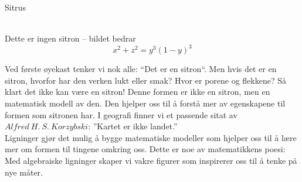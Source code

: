 \documentclass[no]{./../../common/SurferDesc}%
\begin{document}
\footnotesize

\begin{surferPage}
  \begin{surferTitle}Sitrus\end{surferTitle}  \\ %
Dette er ingen sitron – bildet bedrar\\
\smallskip
\[x^2 + z^2 = y^3 (1 - y)^3\] 


\singlespacing
Ved første øyekast tenker vi nok alle: ``Det er en sitron``. Men hvis det er en sitron, hvorfor har den verken lukt eller smak? Hvor er porene og flekkene? Så klart det ikke kan være en sitron! 
\singlespacing
Denne formen er ikke en sitron, men en matematisk modell av den. Den hjelper oss til å forstå mer av egenskapene til formen som sitronen har. I geografi finner vi et passende sitat av $Alfred\ H.\ S.\ Korzybski$: ''Kartet er ikke landet.'' \\
\singlespacing
Ligninger gjør det mulig å bygge matematiske modeller som hjelper oss til å lære mer om formen til tingene omkring oss. 
\singlespacing
Dette er noe av matematikkens poesi: Med algebraiske ligninger skaper vi vakre figurer som inspirerer oss til å tenke på nye måter.


  \begin{surferText}
     \end{surferText}
\end{surferPage}
\end{document}
